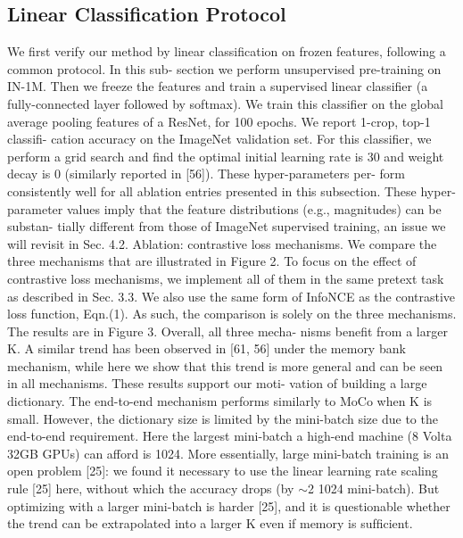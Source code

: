 \documentclass[10pt,twocolumn]{article}  %
\begin{document}
\subsection{Linear Classiﬁcation Protocol}
We first verify our method by linear classification on
frozen features, following a common protocol. In this sub-
section we perform unsupervised pre-training on IN-1M.
Then we freeze the features and train a supervised linear
classifier (a fully-connected layer followed by softmax). We
train this classifier on the global average pooling features of
a ResNet, for 100 epochs. We report 1-crop, top-1 classifi-
cation accuracy on the ImageNet validation set.
For this classifier, we perform a grid search and find the
optimal initial learning rate is 30 and weight decay is 0
(similarly reported in [56]). These hyper-parameters per-
form consistently well for all ablation entries presented in
this subsection. These hyper-parameter values imply that
the feature distributions (e.g., magnitudes) can be substan-
tially different from those of ImageNet supervised training,
an issue we will revisit in Sec. 4.2.
Ablation: contrastive loss mechanisms. We compare the
three mechanisms that are illustrated in Figure 2. To focus
on the effect of contrastive loss mechanisms, we implement
all of them in the same pretext task as described in Sec. 3.3.
We also use the same form of InfoNCE as the contrastive
loss function, Eqn.(1). As such, the comparison is solely on
the three mechanisms.
The results are in Figure 3. Overall, all three mecha-
nisms beneﬁt from a larger K. A similar trend has been
observed in [61, 56] under the memory bank mechanism,
while here we show that this trend is more general and can
be seen in all mechanisms. These results support our moti-
vation of building a large dictionary.
The end-to-end mechanism performs similarly to MoCo
when K is small. However, the dictionary size is limited
by the mini-batch size due to the end-to-end requirement.
Here the largest mini-batch a high-end machine (8 Volta
32GB GPUs) can afford is 1024. More essentially, large
mini-batch training is an open problem [25]: we found it
necessary to use the linear learning rate scaling rule [25]
here, without which the accuracy drops (by $\sim$2%
1024 mini-batch). But optimizing with a larger mini-batch
is harder [25], and it is questionable whether the trend can
be extrapolated into a larger K even if memory is sufﬁcient.
\end{document}

